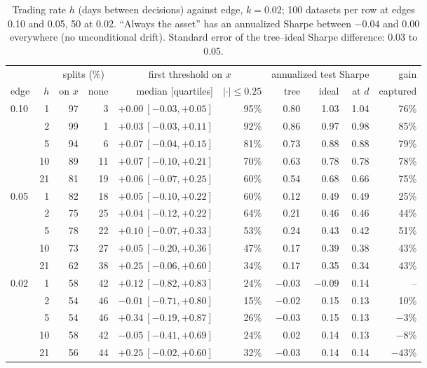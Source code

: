 \documentclass[11pt,a4paper]{article}
\newcommand{\1}{\mathbf{1}}
\begin{document}
\begin{table}[H]
\centering\small
\setlength{\tabcolsep}{4.5pt}
\begin{tabular}{@{}l r rr r r rrr r@{}}
\toprule
& & \multicolumn{2}{c}{splits (\%)} & \multicolumn{2}{c}{first threshold on $x$} & \multicolumn{3}{c}{annualized test Sharpe} & gain\\
\cmidrule(lr){3-4}\cmidrule(lr){5-6}\cmidrule(lr){7-9}
edge & $h$ & on $x$ & none & median [quartiles] & $|\cdot|\le0.25$ & tree & ideal & at $d$ & captured\\
\midrule
0.10 & 1 & 97 & 3 & $+0.00\ [-0.03,+0.05]$ & 95\% & 0.80 & 1.03 & 1.04 & 76\%\\
 & 2 & 99 & 1 & $+0.03\ [-0.03,+0.11]$ & 92\% & 0.86 & 0.97 & 0.98 & 85\%\\
 & 5 & 94 & 6 & $+0.07\ [-0.04,+0.15]$ & 81\% & 0.73 & 0.88 & 0.88 & 79\%\\
 & 10 & 89 & 11 & $+0.07\ [-0.10,+0.21]$ & 70\% & 0.63 & 0.78 & 0.78 & 78\%\\
 & 21 & 81 & 19 & $+0.06\ [-0.07,+0.25]$ & 60\% & 0.54 & 0.68 & 0.66 & 75\%\\
\midrule
0.05 & 1 & 82 & 18 & $+0.05\ [-0.10,+0.22]$ & 60\% & 0.12 & 0.49 & 0.49 & 25\%\\
 & 2 & 75 & 25 & $+0.04\ [-0.12,+0.22]$ & 64\% & 0.21 & 0.46 & 0.46 & 44\%\\
 & 5 & 78 & 22 & $+0.10\ [-0.07,+0.33]$ & 53\% & 0.24 & 0.43 & 0.42 & 51\%\\
 & 10 & 73 & 27 & $+0.05\ [-0.20,+0.36]$ & 47\% & 0.17 & 0.39 & 0.38 & 43\%\\
 & 21 & 62 & 38 & $+0.25\ [-0.06,+0.60]$ & 34\% & 0.17 & 0.35 & 0.34 & 43\%\\
\midrule
0.02 & 1 & 58 & 42 & $+0.12\ [-0.82,+0.83]$ & 24\% & $-0.03$ & $-0.09$ & 0.14 & --\\
 & 2 & 54 & 46 & $-0.01\ [-0.71,+0.80]$ & 15\% & $-0.02$ & 0.15 & 0.13 & 10\%\\
 & 5 & 54 & 46 & $+0.34\ [-0.19,+0.87]$ & 26\% & $-0.03$ & 0.15 & 0.13 & $-3$\%\\
 & 10 & 58 & 42 & $-0.05\ [-0.41,+0.69]$ & 24\% & 0.02 & 0.14 & 0.13 & $-8$\%\\
 & 21 & 56 & 44 & $+0.25\ [-0.02,+0.60]$ & 32\% & $-0.03$ & 0.14 & 0.14 & $-43$\%\\
\bottomrule
\end{tabular}
\caption{Trading rate $h$ (days between decisions) against edge, $k=0.02$; 100 datasets per row at edges 0.10 and 0.05, 50 at 0.02. ``Always the asset'' has an annualized Sharpe between $-0.04$ and $0.00$ everywhere (no unconditional drift). Standard error of the tree--ideal Sharpe difference: 0.03 to 0.05.}
\label{tab:edge}
\end{table}
\end{document}
